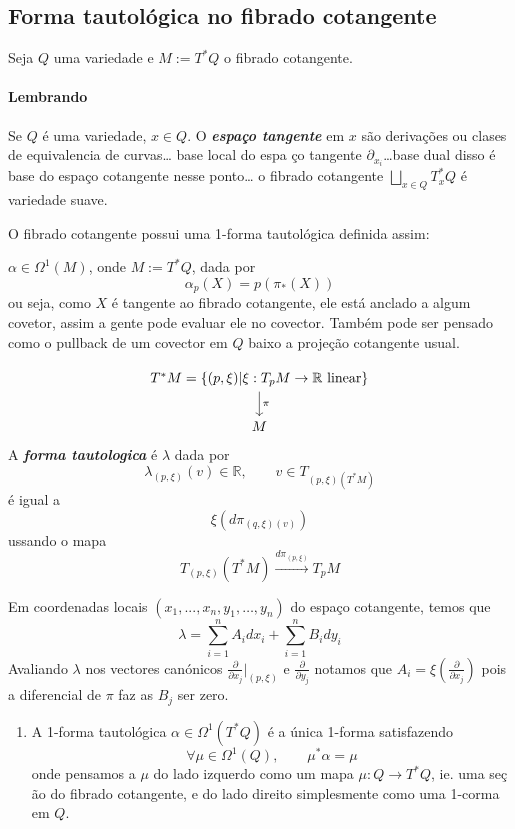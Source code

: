 \subsection{Forma tautol\'ogica no fibrado cotangente}

Seja $Q$ uma variedade e $M :=T^* Q$ o fibrado cotangente.

\paragraph{Lembrando} Se $Q$ \'e uma variedade, $x\in Q$. O \textit{\textbf{espa\c co tangente}} em $ x$ s\~ao derivaç\~oes ou clases de equivalencia de curvas… base local do espa \c co tangente $\partial_{x_i}$…base dual disso \'e base do espa\c co cotangente nesse ponto… o fibrado cotangente $\bigsqcup_{x\in Q}T^*_{x}Q$ \'e variedade suave.

O fibrado cotangente possui uma 1-forma tautol\'ogica definida assim:

\begin{defn}
	$\alpha\in\Omega^{1}(M)$, onde $M:=T^*Q$, dada por
	\[\alpha_p(X)=p(\pi_*(X))\]
	ou seja, como $X$ \'e tangente ao fibrado cotangente, ele est\'a anclado a algum covetor, assim a gente pode evaluar ele no covector. Tamb\'em pode ser pensado como o pullback de um covector em $Q$ baixo a proje\c c\~ao cotangente usual.
\end{defn}

\begin{defn}[Monitoria]
	\[\begin{tikzcd}
		T^*M=\{(p,\xi)|\xi:T_pM\to \mathbb{R}\text{ linear} \} \arrow[d,"\pi"]\\
		M
	\end{tikzcd}\]
	A \textit{\textbf{forma tautologica}}  \'e $\lambda$ dada por
	\[\lambda_{(p,\xi)}(v)\in\mathbb{R},\qquad v\in T_{(p,\xi)(T^*M)}\]
	\'e igual a
	\[\xi(d\pi_{(q,\xi)(v)})\]
	ussando o mapa
\[T_{(p,\xi)}(T^* M)\overset{d\pi_{(p,\xi)}}{\longrightarrow}T_{p}M\]
\end{defn}

Em coordenadas locais $(x_1,...,x_n,y_1,\ldots,y_n)$ do espaço cotangente, temos que
\[\lambda=\sum_{i=1}^nA_i dx_i+\sum_{i=1}^nB_i dy_i\]
Avaliando $\lambda$ nos vectores can\'onicos $\frac{\partial}{\partial x_j}\Big|_{(p,\xi)}$ e $\frac{\partial}{\partial y_j}$ notamos que $A_i=\xi\left( \frac{\partial}{\partial x_j} \right) $ pois a diferencial de $\pi$ faz as $B_j$ ser zero.

\begin{exercise}\leavevmode 
	\begin{enumerate}
		\item A 1-forma tautol\'ogica $\alpha\in\Omega^{1}(T^*Q)$ \'e a \'unica 1-forma satisfazendo
			\[\forall \mu\in\Omega^{1}(Q),\qquad \mu^*\alpha=\mu\]
			onde pensamos a $\mu$ do lado izquerdo como um mapa  $\mu:Q\to T^*Q$, ie. uma se\c c \~ao do fibrado cotangente, e do lado direito simplesmente como uma 1-corma em $Q$.

	\end{enumerate}
\end{exercise}

